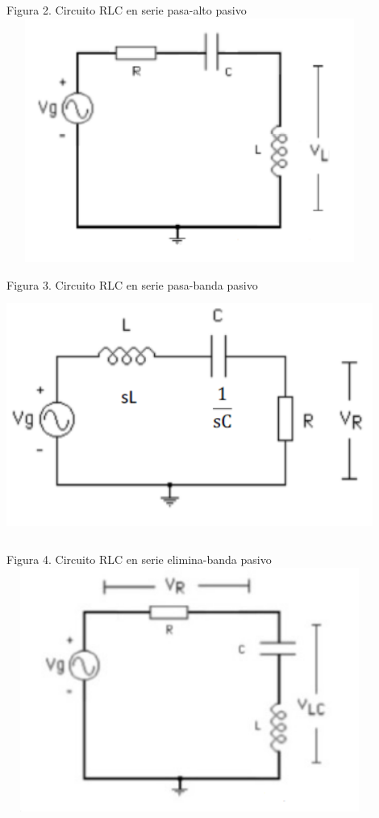 \documentclass[12pt]{article}
\begin{document}
    \vspace{2cm}
    
    \noindent Figura 2. Circuito RLC en serie pasa-alto pasivo\\ \includegraphics[width=12cm,height=8cm]{Img/pasa-alto}
    
    \vspace{3cm}
    
    \noindent Figura 3. Circuito RLC en serie pasa-banda pasivo\\ \includegraphics[width=12cm,height=8cm]{Img/pasa-banda}
    
    \vspace{2cm}
    
    \noindent Figura 4. Circuito RLC en serie elimina-banda pasivo\\ \includegraphics[width=12cm,height=8cm]{Img/elimina-banda}
	
\end{document}
